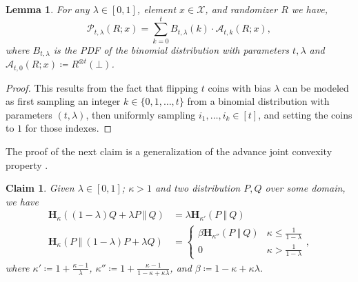 \documentclass{article}
\theoremstyle{plain}
\newtheorem{lemma}[theorem]{Lemma}
\newtheorem{claim}[theorem]{Claim}
\theoremstyle{definition}
\newcommand{\rand}{R}
\newcommand{\domain}{\mathcal{X}}
\newcommand{\HockeyStick}[1]{\boldsymbol{H}_{#1}}
\newcommand{\HockeyStickDiv}[3]{\HockeyStick{#1}\left(#2 ~\left\Vert~ #3 \right. \right)}
\newcommand{\PoisFunc}[3]{\mathcal{P}_{#1}\left(#2; #3\right)}
\newcommand{\allocFunc}[3]{\mathcal{A}_{#1}\left(#2; #3\right)}
\begin{document}
\begin{lemma}\label{lem:PoisDecom}
    For any $\lambda \in [0, 1]$, element $x \in \domain$, and randomizer $\rand$ we have, 
    \[
        \PoisFunc{t, \lambda}{\rand}{x} = \sum_{k = 0}^{t} B_{t, \lambda}(k) \cdot \allocFunc{t, k}{\rand}{x}, 
    \]
    where $B_{t, \lambda}$ is the PDF of the binomial distribution with parameters $t, \lambda$ and $\allocFunc{t, 0}{\rand}{x} \coloneqq \rand^{\otimes t}(\bot)$.
\end{lemma}

\begin{proof}
    This results from the fact that flipping $t$ coins with bias $\lambda$ can be modeled as first sampling an integer $k \in \{0, 1, \ldots, t\}$ from a binomial distribution with parameters $(t, \lambda)$, then uniformly sampling $i_{1}, \ldots, i_{k} \in [t]$, and setting the coins to $1$ for those indexes.
\end{proof}

The proof of the next claim is a generalization of the advance joint convexity property \citep[Theorem 2]{BBG18}.
\begin{claim}\label{clm:advJntCvx}
    Given $\lambda \in [0, 1]$; $\kappa > 1$ and two distribution $P, Q$ over some domain, we have
    \begin{align*}
        \HockeyStickDiv{\kappa}{(1-\lambda)Q + \lambda P}{Q}  & = \lambda \HockeyStickDiv{\kappa'}{P}{Q}
        \\ \HockeyStickDiv{\kappa}{P}{(1-\lambda)P + \lambda Q} & = \begin{cases}
            \beta \HockeyStickDiv{\kappa''}{P}{Q} & \kappa \le \frac{1}{1-\lambda} \\
            0 & \kappa > \frac{1}{1-\lambda}
        \end{cases},
    \end{align*}
    where $\kappa' \coloneqq 1 + \frac{\kappa - 1}{\lambda}$, $\kappa'' \coloneqq 1 + \frac{\kappa - 1}{1 - \kappa + \kappa \lambda}$, and $\beta \coloneqq 1 - \kappa + \kappa \lambda$.
\end{claim}
\end{document}
